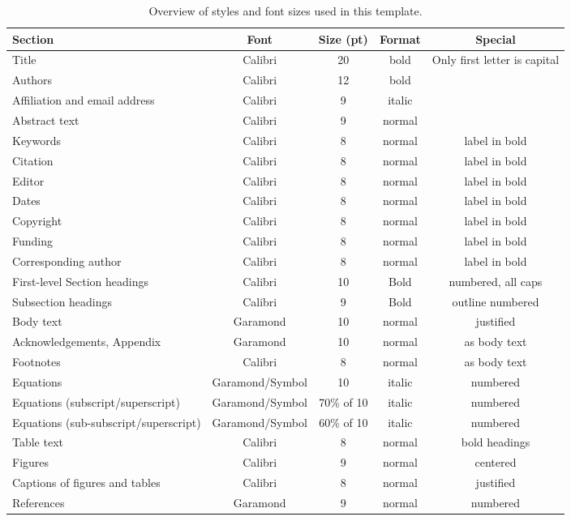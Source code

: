 \documentclass[final]{imeko_acta}
\begin{document}
\begin{table*}[t]
	\caption{Overview of styles and font sizes used in this template.}
	\label{tab:tab1}
	\centering
	\renewcommand{\arraystretch}{1.15}\footnotesize
	\begin{tabularx}{\textwidth}{lCCCC}
		\toprule{}
		\bfseries Section & \bfseries Font & \bfseries Size (pt) & \bfseries Format & \bfseries Special \\
		\midrule
		Title & Calibri & 20 & bold & Only first letter is capital \\
		Authors & Calibri & 12 & bold &  \\
		Affiliation and email address & Calibri & 9 & italic &  \\
		Abstract text & Calibri & 9 & normal &  \\
		Keywords & Calibri & 8 & normal & label in bold \\
		Citation & Calibri & 8 & normal & label in bold \\
		Editor & Calibri & 8 & normal & label in bold \\
		Dates & Calibri & 8 & normal & label in bold \\
		Copyright & Calibri & 8 & normal & label in bold \\
		Funding & Calibri & 8 & normal & label in bold \\
		Corresponding author & Calibri & 8 & normal & label in bold \\
		First-level Section headings  & Calibri & 10 & Bold & numbered, all caps \\
		Subsection headings & Calibri & 9 & Bold & outline numbered \\
		Body text & Garamond & 10 & normal & justified \\
		Acknowledgements, Appendix & Garamond & 10 & normal & as body text \\
		Footnotes  & Calibri & 8 & normal & as body text \\
		Equations & Garamond/Symbol & 10 & italic & numbered \\
		Equations (subscript/superscript) & Garamond/Symbol & 70\% of 10 & italic & numbered \\
		Equations (sub-subscript/superscript) & Garamond/Symbol & 60\% of 10 & italic & numbered \\
		Table text & Calibri & 8 & normal & bold headings \\
		Figures & Calibri & 9 & normal & centered \\
		Captions of figures and tables & Calibri & 8 & normal & justified \\
		References & Garamond & 9 & normal & numbered \\
		\bottomrule
	\end{tabularx}
\end{table*}
\end{document}
